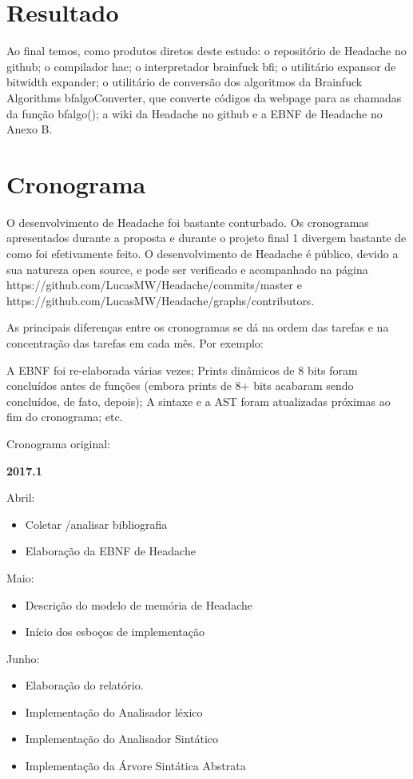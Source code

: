 \section{Resultado}

Ao final temos, como produtos diretos deste estudo: o repositório de Headache no github; o compilador hac; o interpretador brainfuck bfi; o utilitário expansor de bitwidth expander; o utilitário de conversão dos algoritmos da Brainfuck Algorithms  bfalgoConverter, que converte códigos da webpage para as chamadas da função bfalgo(); a wiki da Headache no github e a EBNF de Headache no Anexo B.

\section{Cronograma}

O desenvolvimento de Headache foi bastante conturbado. Os cronogramas apresentados durante a proposta e durante o projeto final 1 divergem bastante de como foi efetivamente feito.  O desenvolvimento de Headache é público, devido a sua natureza open source, e pode ser verificado e acompanhado na página https://github.com/LucasMW/Headache/commits/master e https://github.com/LucasMW/Headache/graphs/contributors.

As principais diferenças entre os cronogramas se dá na ordem das tarefas e na concentração das tarefas em cada mês. Por exemplo:

A EBNF foi re-elaborada várias vezes; Prints dinâmicos de 8 bits foram concluídos antes de funções (embora prints de 8+ bits acabaram sendo concluídos, de fato, depois); A sintaxe e a AST foram atualizadas próximas ao fim do cronograma; etc.

Cronograma original:

\textbf{2017.1}

Abril:
\begin{itemize}
    \item Coletar /analisar bibliografia
    \item Elaboração da EBNF de Headache
\end{itemize}

Maio:
\begin{itemize}
    \item Descrição do modelo de memória de Headache 
    \item Início dos esboços de implementação
\end{itemize}

Junho:
\begin{itemize}
    \item Elaboração do relatório.
    \item Implementação do Analisador léxico
    \item Implementação do Analisador Sintático
    \item Implementação da Árvore Sintática Abstrata
\end{itemize}

